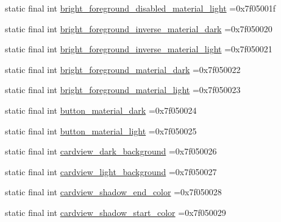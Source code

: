 \begin{DoxyCompactItemize}
\item 
static final int \mbox{\hyperlink{classbr_1_1unb_1_1cic_1_1mp_1_1marketmaster_1_1R_1_1color_a36e7fb40286078a2b15218147fd386e2}{bright\+\_\+foreground\+\_\+disabled\+\_\+material\+\_\+light}} =0x7f05001f
\item 
static final int \mbox{\hyperlink{classbr_1_1unb_1_1cic_1_1mp_1_1marketmaster_1_1R_1_1color_aa6f8f0f2ecb919edc4a87ad33f231196}{bright\+\_\+foreground\+\_\+inverse\+\_\+material\+\_\+dark}} =0x7f050020
\item 
static final int \mbox{\hyperlink{classbr_1_1unb_1_1cic_1_1mp_1_1marketmaster_1_1R_1_1color_ad8e8fc05c93991642918797d599c4900}{bright\+\_\+foreground\+\_\+inverse\+\_\+material\+\_\+light}} =0x7f050021
\item 
static final int \mbox{\hyperlink{classbr_1_1unb_1_1cic_1_1mp_1_1marketmaster_1_1R_1_1color_a55ddc473b9fcee67c1383d7f794609b4}{bright\+\_\+foreground\+\_\+material\+\_\+dark}} =0x7f050022
\item 
static final int \mbox{\hyperlink{classbr_1_1unb_1_1cic_1_1mp_1_1marketmaster_1_1R_1_1color_a8015a7b37ac90eca6cd54198a28a0159}{bright\+\_\+foreground\+\_\+material\+\_\+light}} =0x7f050023
\item 
static final int \mbox{\hyperlink{classbr_1_1unb_1_1cic_1_1mp_1_1marketmaster_1_1R_1_1color_a6e0c74905f2e7ddad84799992c47d4f8}{button\+\_\+material\+\_\+dark}} =0x7f050024
\item 
static final int \mbox{\hyperlink{classbr_1_1unb_1_1cic_1_1mp_1_1marketmaster_1_1R_1_1color_a8901b0f6f96a453be89c6e9930c09f88}{button\+\_\+material\+\_\+light}} =0x7f050025
\item 
static final int \mbox{\hyperlink{classbr_1_1unb_1_1cic_1_1mp_1_1marketmaster_1_1R_1_1color_a8ee5ff191827126720316d79220b8ac1}{cardview\+\_\+dark\+\_\+background}} =0x7f050026
\item 
static final int \mbox{\hyperlink{classbr_1_1unb_1_1cic_1_1mp_1_1marketmaster_1_1R_1_1color_ad10b240bf825a4b4d44820872dab1839}{cardview\+\_\+light\+\_\+background}} =0x7f050027
\item 
static final int \mbox{\hyperlink{classbr_1_1unb_1_1cic_1_1mp_1_1marketmaster_1_1R_1_1color_ac9039e02fad514297fbbdfbcba0b5d6a}{cardview\+\_\+shadow\+\_\+end\+\_\+color}} =0x7f050028
\item 
static final int \mbox{\hyperlink{classbr_1_1unb_1_1cic_1_1mp_1_1marketmaster_1_1R_1_1color_a6fe194265032a4ad7e98f8707671a55f}{cardview\+\_\+shadow\+\_\+start\+\_\+color}} =0x7f050029
\item 

\end{DoxyCompactItemize}
